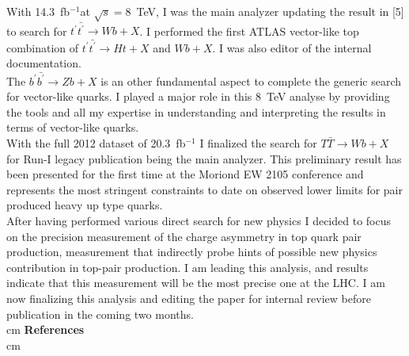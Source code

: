 \documentclass[12pt]{article}
\begin{document}
\noindent [7] With 14.3~fb$^{-1}$at $\sqrt{s}=8$~TeV, I was the main analyzer updating the result in [5] to search for  $t^{\prime}\bar{t^{\prime}} \rightarrow Wb+X$.
I performed the first ATLAS vector-like top combination of $t^{\prime}\bar{t^{\prime}} \rightarrow Ht+X$ and $ Wb+X$. I was also editor of the internal documentation.\\


\noindent [8] The $b^{\prime}\bar{b^{\prime}} \rightarrow Zb+X$ is an other fundamental aspect to complete the generic search for vector-like quarks.
I played a major role in this 8~TeV analyse by providing the tools and all my expertise in  understanding and interpreting the results in terms of vector-like quarks. \\

\noindent [9] With the full 2012 dataset of 20.3~fb$^{-1}$ I finalized the search for $T\bar{T} \rightarrow Wb+X$  for Run-I legacy publication being the main analyzer.
This preliminary result has been presented for the first time at the Moriond EW 2105 conference and represents the most stringent constraints to date on observed lower limits for pair produced heavy up type quarks.  \\

\noindent [10] After having performed various direct search for new physics I decided to focus on the precision measurement of the charge asymmetry in top quark pair production, 
measurement that indirectly probe hints of possible new physics contribution in top-pair production. I am leading this analysis, and results indicate that this measurement will be the 
most precise one at the LHC. I am now finalizing this analysis and editing the paper for internal review before publication in the coming two months.\\




 cm
{\bf \Large  References }\\
 cm
\end{document}
